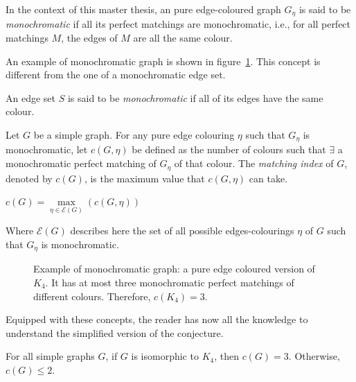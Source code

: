 \begin{definition}
    \label{def:monochromatic_graph}
    In the context of this master thesis, an pure edge-coloured graph $G_\eta$ is said to be \textit{monochromatic} if all its perfect matchings are monochromatic, i.e., for all perfect matchings $M$, the edges of $M$ are all the same colour.
\end{definition}

An example of monochromatic graph is shown in figure~\ref{fig:k4_pm}.
This concept is different from the one of a monochromatic edge set.

\begin{definition}
    \label{def:monochromatic_edge_set}
    An edge set $S$ is said to be \textit{monochromatic} if all of its edges have the same colour.
\end{definition}

\begin{definition}
    \label{def:matching_index}
    Let $G$ be a simple graph.
    For any pure edge colouring $\eta$ such that $G_\eta$ is monochromatic, let $c(G, \eta)$ be defined as the number of colours such that $\exists$ a monochromatic perfect matching of $G_\eta$ of that colour.
    The \textit{matching index} of $G$, denoted by $c(G)$, is the maximum value that $c(G, \eta)$ can take.
    \begin{center}
        $c(G) = \max\limits_{\eta \in \mathcal{E}(G)}(c(G, \eta))$
    \end{center}
    Where $\mathcal{E}(G)$ describes here the set of all possible edges-colourings $\eta$ of $G$ such that $G_\eta$ is monochromatic.
\end{definition}

\begin{figure}[H]
    \caption{Example of monochromatic graph: a pure edge coloured version of $K_4$. It has at most three monochromatic perfect matchings of different colours.
        Therefore, $c(K_4) = 3$.}
    \label{fig:k4_pm}
\end{figure}

Equipped with these concepts, the reader has now all the knowledge to understand the simplified version of the conjecture.

\begin{theorem}
    \label{thm:bogdanov}
    For all simple graphs $G$, if $G$ is isomorphic to $K_4$, then $c(G) = 3$.
    Otherwise, $c(G) \leq 2$.
\end{theorem}

